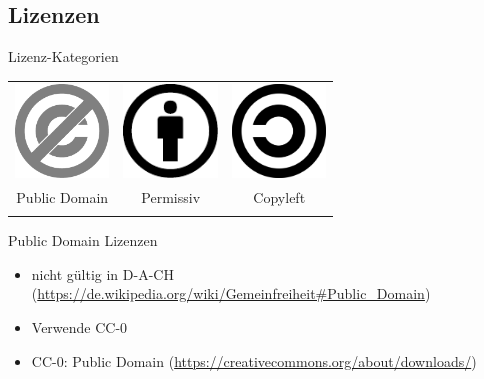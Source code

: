 
\subsection{Lizenzen}
\label{sec:lizenzen}
\subsectionframe

\begin{frame}{Lizenz-Kategorien}
	\begin{center}
		\begin{tabular}{ccc}
		\includegraphics[width=2.5cm]{res/PD-icon.pdf} & \includegraphics[width=2.5cm]{res/by.pdf} & \includegraphics[width=2.5cm]{res/copyleft.pdf} \\ 
		Public Domain & Permissiv & Copyleft \\
		\hspace{3cm} & \hspace{3cm} & \hspace{3cm} \\
		\end{tabular} 
	\end{center}
\end{frame}
\note
{
	Public Domain Lizenzen
	\begin{itemize}
		\item nicht gültig in D-A-CH (\url{https://de.wikipedia.org/wiki/Gemeinfreiheit\#Public_Domain})
		\item Verwende CC-0
		\item CC-0: Public Domain (\url{https://creativecommons.org/about/downloads/})
	\end{itemize}
}
\note
